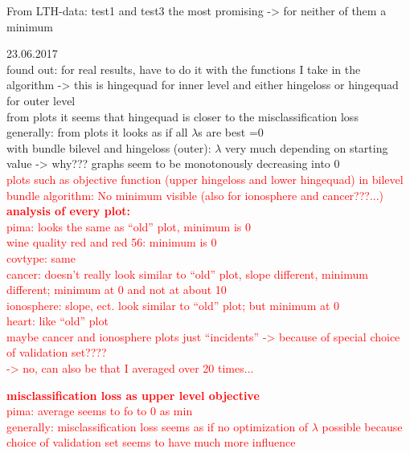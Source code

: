 From LTH-data: test1 and test3 the most promising -> for neither of them a minimum



23.06.2017\\
found out: for real results, have to do it with the functions I take in the algorithm -> this is hingequad for inner level and either hingeloss or hingequad for outer level\\
from plots it seems that hingequad is closer to the misclassification loss\\
generally: from plots it looks as if all \(\lambda\)s are best =0\\
with bundle bilevel and hingeloss (outer): \(\lambda\) very much depending on starting value -> why??? graphs seem to be monotonously decreasing into 0  \\


\textcolor{red}{plots such as objective function (upper hingeloss and lower hingequad) in bilevel bundle algorithm: No minimum visible (also for ionosphere and cancer???...)\\
\textbf{analysis of every plot:}\\
pima: looks the same as ``old'' plot, minimum is 0\\
wine quality red and red 56: minimum is 0 \\
covtype: same\\
cancer: doesn't really look similar to ``old'' plot, slope different, minimum different; minimum at 0 and not at about 10\\
ionosphere: slope, ect. look similar to ``old'' plot; but minimum at 0 \\
heart: like ``old'' plot \\
maybe cancer and ionosphere plots just ``incidents'' -> because of special choice of validation set????\\
-> no, can also be that I averaged over 20 times...}

\textcolor{red}{\textbf{misclassification loss as upper level objective}\\
pima: average seems to fo to 0 as min \\
generally: misclassification loss seems as if no optimization of \(\lambda\) possible because choice of validation set seems to have much more influence}

